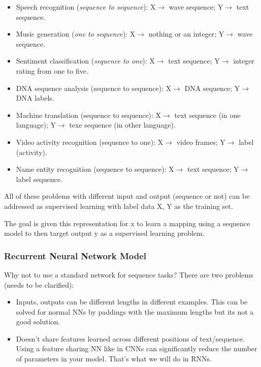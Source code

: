 \begin{itemize}
    \item Speech recognition (\textit{sequence to sequence}): X$\to$ wave sequence; Y$\to$ text sequence.
    \item Music generation (\textit{one to sequence}): X$\to$ nothing or an integer; Y$\to$ wave sequence.
    \item Sentiment classification (\textit{sequence to one}): X$\to$ text sequence; Y$\to$ integer rating from one to five.
    \item DNA sequence analysis (sequence to sequence): X$\to$ DNA sequence; Y$\to$ DNA labels.
    \item Machine translation (sequence to sequence): X$\to$ text sequence (in one language); Y$\to$ texe sequence (in other language). 
    \item Video activity recognition (sequence to one): X$\to$ video frames; Y$\to$ label (activity).
    \item Name entity recognition (sequence to sequence): X$\to$ text sequence; Y$\to$ label sequence.
\end{itemize}

All of these problems with different input and output (sequence or not) can be addressed as supervised learning with label data X, Y as the training set.

The goal is given this representation for x to learn a mapping using a sequence model to then target output y as a supervised learning problem.

\subsubsection{Recurrent Neural Network Model}
Why not to use a standard network for sequence tasks? There are two problems (needs to be clarified):


\begin{itemize}
    \item Inputs, outputs can be different lengths in different examples. This can be solved for normal NNs by paddings with the maximum lengths but its not a good solution.
    \item Doesn't share features learned across different positions of text/sequence. Using a feature sharing NN like in CNNs can significantly reduce the number of parameters in your model. That's what we will do in RNNs.
\end{itemize}

